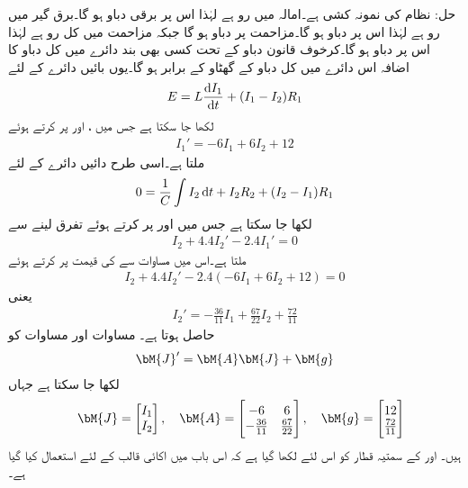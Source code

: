 حل: نظام کی نمونہ کشی ہے۔امالہ میں رو  ہے لہٰذا اس پر برقی دباو  ہو گا۔برق گیر میں رو  ہے لہٰذا اس پر دباو  ہو گا۔مزاحمت  پر دباو  ہو گا جبکہ مزاحمت  میں کل رو  ہے لہٰذا اس پر دباو  ہو گا۔کرخوف قانون دباو کے تحت کسی بھی بند دائرے میں کل دباو کا اضافہ اس دائرے میں کل دباو کے گھٹاو کے برابر ہو گا۔یوں بائیں دائرے کے لئے
\begin{align*}
E=L\frac{\dif I_1}{\dif t}+(I_1-I_2)R_1
\end{align*}
لکھا جا سکتا ہے جس میں ،  اور  پر کرتے ہوئے
\begin{align}\label{مساوات_مثال_برقی_جال_الف}
I_1'=-6I_1+6I_2+12
\end{align}
ملتا ہے۔اسی طرح دائیں دائرے کے لئے
\begin{align*}
0=\frac{1}{C}\int I_2 \dif t+I_2R_2+(I_2-I_1)R_1
\end{align*}
لکھا جا سکتا ہے جس میں  اور  پر کرتے ہوئے تفرق لینے سے
\begin{align*}
I_2+4.4I_2'-2.4I_1'=0
\end{align*}
ملتا ہے۔اس میں مساوات  سے  کی قیمت پر کرتے ہوئے
\begin{align*}
I_2+4.4I_2'-2.4(-6I_1+6I_2+12)=0
\end{align*}
یعنی
\begin{align}\label{مساوات_مثال_برقی_جال_ب}
I_2'=-\frac{36}{11}I_1+\frac{67}{22}I_2+\frac{72}{11}
\end{align}
حاصل ہوتا ہے۔ مساوات  اور مساوات  کو 
\begin{align}\label{مساوات_نظام_برقی_غیر-متجانس_الف}
\bM{J}'=\bM{A} \bM{J}+\bM{g} 
\end{align}
لکھا جا سکتا ہے جہاں 
\begin{align*}
\quad \bM{J}=\begin{bmatrix} I_1 \\ I_2 \end{bmatrix},\quad \bM{A}=\begin{bmatrix} -6 & 6\\ -\frac{36}{11}& \frac{67}{22} \end{bmatrix}, \quad  \bM{g}=\begin{bmatrix} 12 \\ \frac{72}{11} \end{bmatrix}
\end{align*}
ہیں۔ اور  کے  سمتیہ قطار کو  اس لئے لکھا گیا ہے کہ اس باب میں  اکائی قالب کے لئے استعمال کیا گیا ہے۔ 

